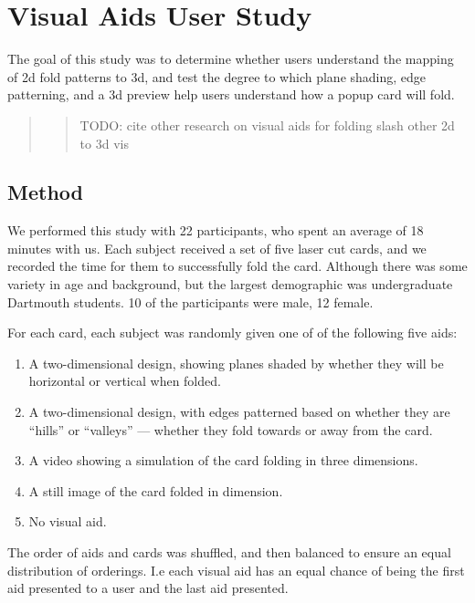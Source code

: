 \section{Visual Aids User Study}\label{visual-aids-user-study}

The goal of this study was to determine whether users understand the
mapping of 2d fold patterns to 3d, and test the degree to which plane
shading, edge patterning, and a 3d preview help users understand how a
popup card will fold.

\begin{quote}
\begin{quote}
TODO: cite other research on visual aids for folding slash other 2d to
3d vis
\end{quote}
\end{quote}

\subsection{Method}\label{method}

We performed this study with 22 participants, who spent an average of 18
minutes with us. Each subject received a set of five laser cut cards,
and we recorded the time for them to successfully fold the card.
Although there was some variety in age and background, but the largest
demographic was undergraduate Dartmouth students. 10 of the participants
were male, 12 female.

For each card, each subject was randomly given one of of the following
five aids:

\begin{enumerate}
\def\labelenumi{\arabic{enumi})}
\itemsep1pt\parskip0pt
\item
  A two-dimensional design, showing planes shaded by whether they will
  be horizontal or vertical when folded.
\item
  A two-dimensional design, with edges patterned based on whether they
  are ``hills'' or ``valleys'' --- whether they fold towards or away
  from the card.
\item
  A video showing a simulation of the card folding in three dimensions.
\item
  A still image of the card folded in dimension.
\item
  No visual aid.
\end{enumerate}

The order of aids and cards was shuffled, and then balanced to ensure an
equal distribution of orderings. I.e each visual aid has an equal chance
of being the first aid presented to a user and the last aid presented.

